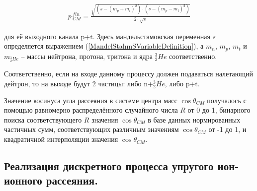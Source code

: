 \documentclass[a4paper,12pt]{article}
\begin{document}
\begin{large}
\begin{equation}
\label{PCMInelasticDDAfterPT}
\begin{aligned} 
  p\,_{CM}^{fin} = \frac{ \sqrt{ \left( s-\left( m_p + m_t\right)^2 \right) \cdot \left( s-\left( m_p - m_t \right)^2 \right) } }{2\cdot \sqrt{s}}
\end{aligned}
\end{equation}

	для её выходного канала p+t.
	Здесь мандельстамовская переменная $s$ определяется выражением (\ref{MandelStahmSVariableDefinition}), а $m_n$, $m_p$, $m_t$ и $m_{^3_2He}$ -- массы нейтрона, протона, тритона и ядра $^3_2He$ соответственно.
	
	Соответственно, если на входе данному процессу должен подаваться налетающий дейтрон, то на выходе будут 2 частицы: либо n+$^3_2He$, либо p+t.
	
	Значение косинуса угла рассеяния в системе центра масс $\cos{\theta_{CM}}$ получалось с помощью равномерно распределённого случайного числа $R$ от 0 до 1, бинарного поиска соответствующего $R$ значения $\cos{\theta_{CM}}$ в базе данных нормированных частичных сумм, соответствующих различным значениям $\cos{\theta_{CM}}$ от -1 до 1, и квадратичной интерполяции значения $\cos{\theta_{CM}}$. 
	

\subsection{Реализация дискретного процесса упругого ион-ионного рассеяния.}
\label{ElasticIonIonScatteringRealization}


\end{large}
\end{document}
